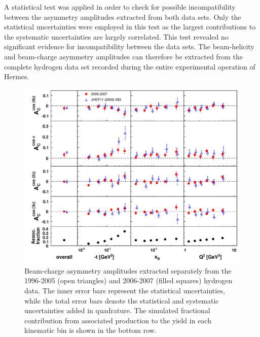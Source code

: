 A statistical test was applied in order to check for possible incompatibility between the asymmetry amplitudes extracted from both data sets. Only the statistical uncertainties were employed in this test as the largest contributions to the systematic uncertainties are largely correlated. This test revealed no significant evidence for incompatibility between the data sets. The beam-helicity and beam-charge asymmetry amplitudes can therefore be extracted from the complete hydrogen data set recorded during the entire experimental operation of H{\sc ermes}.
\begin{figure}
\begin{center}
 \includegraphics[width=15cm,keepaspectratio]{bcaplots_eml_par13_bin6_pic_cluster_0607_9605_withassoc}
  \caption{Beam-charge asymmetry amplitudes extracted separately from the 1996-2005 (open triangles) and 2006-2007 (filled squares) hydrogen data.
The inner error bars represent the statistical uncertainties, while the total error bars denote the statistical and systematic uncertainties added in quadrature. The simulated fractional contribution from associated production to the yield in each kinematic bin is shown in the bottom row.}
 \label{release_bca_0607}
\end{center}
 \end{figure}

